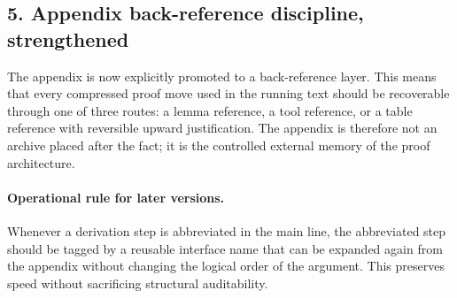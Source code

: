 \subsection*{5. Appendix back-reference discipline, strengthened}
The appendix is now explicitly promoted to a back-reference layer. This means
that every compressed proof move used in the running text should be recoverable
through one of three routes: a lemma reference, a tool reference, or a table
reference with reversible upward justification. The appendix is therefore not an
archive placed after the fact; it is the controlled external memory of the proof
architecture.

\paragraph{Operational rule for later versions.}
Whenever a derivation step is abbreviated in the main line, the abbreviated step
should be tagged by a reusable interface name that can be expanded again from
the appendix without changing the logical order of the argument. This preserves
speed without sacrificing structural auditability.


